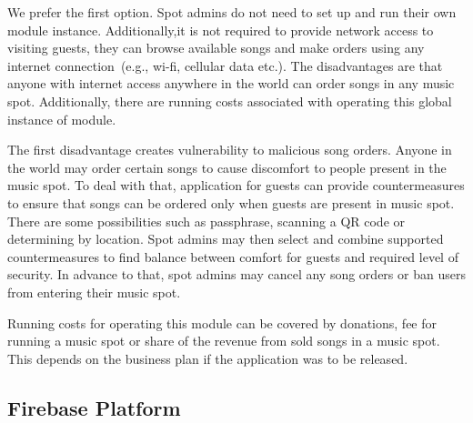\par
We prefer the first option. Spot admins do not need to set up and run their own module instance. Additionally,it is not required to provide network access to visiting guests, they can browse available songs and make orders using any internet connection~(e.g., wi-fi, cellular data etc.). The disadvantages are that anyone with internet access anywhere in the world can order songs in any music spot. Additionally, there are running costs associated with operating this global instance of module.
\par
The first disadvantage creates vulnerability to malicious song orders. Anyone in the world may order certain songs to cause discomfort to people present in the music spot. To deal with that, application for guests can provide countermeasures to ensure that songs can be ordered only when guests are present in music spot. There are some possibilities such as passphrase, scanning a QR code or determining by location. Spot admins may then select and combine supported countermeasures to find balance between comfort for guests and required level of security. In advance to that, spot admins may cancel any song orders or ban users from entering their music spot.
\par
Running costs for operating this module can be covered by donations, fee for running a music spot or share of the revenue from sold songs in a music spot. This depends on the business plan if the application was to be released.

\subsection{Firebase Platform}

